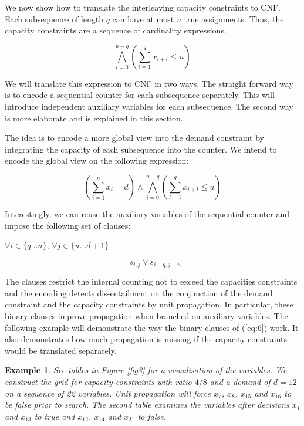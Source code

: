 \documentclass[]{easychair}
\newtheorem{example}[theorem]{Example}
\begin{document}
We now show how to translate the interleaving capacity constraints to CNF. Each subsequence of length $q$ can have at
most $u$ true assignments. Thus, the capacity constraints are a sequence of cardinality expressions. 

$$\bigwedge_{i=0}^{n-q}(\sum_{l=1}^q x_{i+l} \leq u )$$

We will translate this expression to CNF in two ways. The straight forward way is to encode a sequential counter for
each subsequence separately. This will introduce independent auxiliary variables for each subsequence. The second way is
more elaborate and is explained in this section.

The idea is to encode a more global view into the demand constraint by integrating the capacity of each subsequence into
the counter. We intend to encode the global view on the following expression: 

$$ (\sum_{i=1}^n x_{i} = d) \wedge \bigwedge_{i=0}^{n-q}(\sum_{l=1}^q x_{i+l} \leq u )$$

Interestingly, we can reuse the auxiliary variables of the sequential counter and impose the following set of clauses: 

$\forall {i \in \{q \ldots n\}}$, $\forall {j\in\{u\ldots d+1\}}$: 

\begin{equation} \label{eq:6}
    \neg s_{i,j} \vee s_{i-q,j-u}
\end{equation}               

The clauses restrict the internal counting not to exceed the capacities constraints and the encoding detects
dis-entailment on the conjunction of the demand constraint and the capacity constraints by unit propagation. In
particular, these binary clauses improve propagation when branched on auxiliary variables. The following example will
demonstrate the way the binary clauses of (\ref{eq:6}) work. It also demonstrates how much propagation is missing if the
capacity constraints would be translated separately. 

\begin{example}
\label{ex:large} See tables in Figure \ref{fig3} for a visualisation of the variables. We construct the grid for 
capacity constraints with ratio $4/8$ and a demand of $d=12$ on a sequence of 22 variables. Unit propagation will force $x_{7}$,
$x_{8}$, $x_{15}$ and $x_{16}$ to be false prior to search. The second table examines the variables after decisions
$x_{1}$ and $x_{13}$ to true and $x_{12}$, $x_{14}$ and $x_{21}$ to false.
\end{example}
\end{document}
